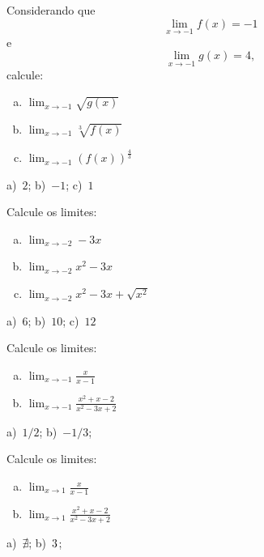 \begin{exer}
  Considerando que
  \begin{equation}
    \lim_{x\to -1} f(x) = -1
  \end{equation}
  e
  \begin{equation}
    \lim_{x\to -1} g(x) = 4,
  \end{equation}
  calcule:
  \begin{enumerate}[a)]
  \item $\displaystyle\lim_{x\to -1} \sqrt{g(x)}$
  \item $\displaystyle\lim_{x\to -1} \sqrt[3]{f(x)}$
  \item $\displaystyle\lim_{x\to -1} (f(x))^{\frac{4}{3}}$
  \end{enumerate}
\end{exer}
\begin{resp}
  a)~$2$; b)~$-1$; c)~$1$
\end{resp}

\begin{exer}
  Calcule os limites:
  \begin{enumerate}[a)]
  \item $\displaystyle\lim_{x\to -2} -3x$\\
  \item $\displaystyle\lim_{x\to -2} x^2-3x$\\    
  \item $\displaystyle\lim_{x\to -2} x^2-3x+\sqrt{x^2}$\\    
  \end{enumerate}
\end{exer}
\begin{resp}
  a)~$6$; b)~$10$; c)~$12$
\end{resp}

\begin{exer}
  Calcule os limites:
  \begin{enumerate}[a)]
  \item $\displaystyle\lim_{x\to -1} \frac{x}{x-1}$\\
  \item $\displaystyle\lim_{x\to -1} \frac{x^2+x-2}{x^2-3x+2}$\\    
  \end{enumerate}
\end{exer}
\begin{resp}
  a)~$1/2$; b)~$-1/3$;
\end{resp}

\begin{exer}
  Calcule os limites:
  \begin{enumerate}[a)]
  \item $\displaystyle\lim_{x\to 1} \frac{x}{x-1}$\\
  \item $\displaystyle\lim_{x\to 1} \frac{x^2+x-2}{x^2-3x+2}$\\    
  \end{enumerate}
\end{exer}
\begin{resp}
  a)~$\nexists$; b)~$\-3$;
\end{resp}

